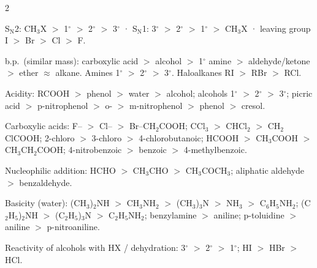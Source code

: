 \documentclass[9pt,a4paper]{extarticle}
\begin{document}
\begin{multicols}{2}
{\scriptsize
\begin{fl}
\item S$_\text{N}$2: CH$_3$X $>$ 1$^\circ$ $>$ 2$^\circ$ $>$ 3$^\circ$ \;·\; S$_\text{N}$1: 3$^\circ$ $>$ 2$^\circ$ $>$ 1$^\circ$ $>$ CH$_3$X \;·\; leaving group I $>$ Br $>$ Cl $>$ F.
\item b.p.\ (similar mass): carboxylic acid $>$ alcohol $>$ 1$^\circ$ amine $>$ aldehyde/ketone $>$ ether $\approx$ alkane. Amines 1$^\circ$ $>$ 2$^\circ$ $>$ 3$^\circ$. Haloalkanes RI $>$ RBr $>$ RCl.
\item Acidity: RCOOH $>$ phenol $>$ water $>$ alcohol; alcohols 1$^\circ$ $>$ 2$^\circ$ $>$ 3$^\circ$; picric acid $>$ p-nitrophenol $>$ o- $>$ m-nitrophenol $>$ phenol $>$ cresol.
\item Carboxylic acids: F-- $>$ Cl-- $>$ Br--CH$_2$COOH; CCl$_3$ $>$ CHCl$_2$ $>$ CH$_2$ClCOOH; 2-chloro $>$ 3-chloro $>$ 4-chlorobutanoic; HCOOH $>$ CH$_3$COOH $>$ CH$_3$CH$_2$COOH; 4-nitrobenzoic $>$ benzoic $>$ 4-methylbenzoic.
\item Nucleophilic addition: HCHO $>$ CH$_3$CHO $>$ CH$_3$COCH$_3$; aliphatic aldehyde $>$ benzaldehyde.
\item Basicity (water): (CH$_3$)$_2$NH $>$ CH$_3$NH$_2$ $>$ (CH$_3$)$_3$N $>$ NH$_3$ $>$ C$_6$H$_5$NH$_2$; (C$_2$H$_5$)$_2$NH $>$ (C$_2$H$_5$)$_3$N $>$ C$_2$H$_5$NH$_2$; benzylamine $>$ aniline; p-toluidine $>$ aniline $>$ p-nitroaniline.
\item Reactivity of alcohols with HX / dehydration: 3$^\circ$ $>$ 2$^\circ$ $>$ 1$^\circ$; HI $>$ HBr $>$ HCl.
\end{fl}\par}


\end{multicols}
\end{document}

